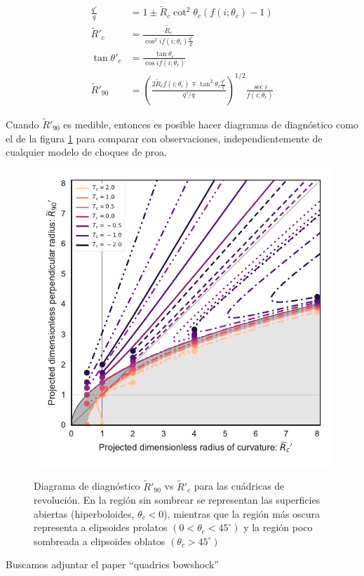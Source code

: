\begin{align}
  \frac{q'}{q} &= 1 \pm \tilde{R}_c\cot^2\theta_c\left(f(i;\theta_c) - 1\right) \\
  \tilde{R}'_c &= \frac{\tilde{R_c}}{\cos^2if(i;\theta_c)\frac{q'}{q}} \label{eq:Rpc-quad}\\
  \tan\theta'_c &= \frac{\tan\theta_c}{\cos if(i;\theta_c)} \label{eq:thcp-quad}\\
  \tilde{R}'_{90} &= \left(\frac{2\tilde{R}_cf(i;\theta_c) \mp
                    \tan^2\theta_c\frac{q'}{q}}{q'/q}\right)^{1/2}\frac{\sec i}{f(i;\theta_c)}
                    \label{eq:Rp90-quad}
\end{align}

Cuando $\tilde{R}'_{90}$ es medible, entonces es posible hacer diagramas de diagnóstico como
el de la figura \ref{fig:diagnostic} para comparar con observaciones, independientemente de
cualquier modelo de choques de proa.

\begin{figure}
  \includegraphics[width=0.5\linewidth]{./Figures/projected-R90-vs-Rc}
  \label{fig:diagnostic}
  \caption{Diagrama de diagnóstico $\tilde{R}'_{90}$ vs $\tilde{R}'_c$ para las cuádricas
    de revolución. En la región sin sombrear se representan las superficies abiertas
    (hiperboloides, $\theta_c <0$), mientras que la región más oscura representa  a
    elipsoides prolatos  $(0 < \theta_c < 45^\circ)$ y la región poco sombreada a
    elipsoides oblatos $(\theta_c > 45^\circ)$}
\end{figure}

Buscamos adjuntar el paper ``quadrics bowshock''
